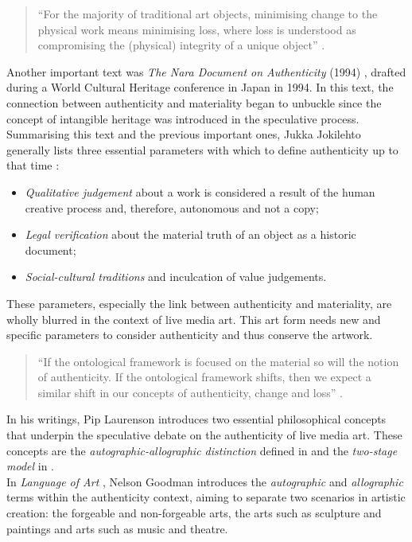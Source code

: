 \begin{quote}
    “For the majority of traditional art objects, minimising change to the physical work means minimising loss, where loss is understood as compromising the (physical) integrity of a unique object” \cite{laurenson2006authenticity}.
\end{quote}
Another important text was \textit{The Nara Document on Authenticity} (1994) \cite{naradocument1994}, drafted during a World Cultural Heritage conference in Japan in 1994. In this text, the connection between authenticity and materiality began to unbuckle since the concept of intangible heritage was introduced in the speculative process.\\
Summarising this text and the previous important ones, Jukka Jokilehto generally lists three essential parameters with which to define authenticity up to that time \cite{jokilehto2010conservation}:
\begin{itemize}
    \item \textit{Qualitative judgement} about a work is considered a result of the human creative process and, therefore, autonomous and not a copy;
    \item \textit{Legal verification} about the material truth of an object as a historic document;
    \item \textit{Social-cultural traditions} and inculcation of value judgements.
\end{itemize}
These parameters, especially the link between authenticity and materiality, are wholly blurred in the context of live media art. This art form needs new and specific parameters to consider authenticity and thus conserve the artwork.\\
\begin{quote}
    “If the ontological framework is focused on the material so will the notion of authenticity. If the ontological framework shifts, then we expect a similar shift in our concepts of authenticity, change and loss” \cite{laurenson2006authenticity}.
\end{quote}
In his writings, Pip Laurenson \cite{laurenson2004management, laurenson2006authenticity} introduces two essential philosophical concepts that underpin the speculative debate on the authenticity of live media art. These concepts are the \textit{autographic-allographic distinction} defined in \cite{goodman1968languages} and the \textit{two-stage model} in \cite{davies2001musical}.\\
In \textit{Language of Art} \cite{goodman1968languages}, Nelson Goodman introduces the \textit{autographic} and \textit{allographic} terms within the authenticity context, aiming to separate two scenarios in artistic creation: the forgeable and non-forgeable arts, the arts such as sculpture and paintings and arts such as music and theatre.
